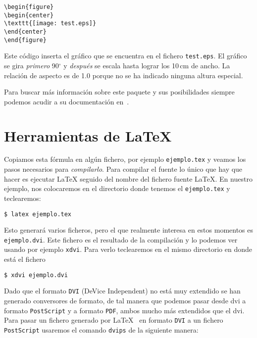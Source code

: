 \begin{code}
\begin{verbatim}
\begin{figure}
\begin{center}
\texttt{[image: test.eps]}
\end{center}
\end{figure}
\end{verbatim}
\end{code}

Este  código  inserta  el  gráfico  que se  encuentra  en  el  fichero
\texttt{test.eps}.  El gráfico  se  gira  \emph{primero} 90$^\circ$  y
\emph{después} se escala hasta lograr los 10\,cm de ancho. La relación
de aspecto es de 1.0 porque no se ha indicado ninguna altura especial.

Para buscar  más información  sobre este  paquete y  sus posibilidades
siempre podemos acudir a su documentación en~\cite{graphics}.

\section{Herramientas de \LaTeX}

Copiamos esta fórmula en algún  fichero, por ejemplo {\tt ejemplo.tex}
y veamos los pasos necesarios  para {\em compilarlo}. Para compilar el
fuente  lo  único que  hay  que  hacer  es ejecutar  {\LaTeX}  seguido
del  nombre  del fichero  fuente  {\LaTeX}.  En nuestro  ejemplo,  nos
colocaremos  en el  directorio donde  tenemos el  {\tt ejemplo.tex}  y
teclearemos:

\begin{verbatim}
$ latex ejemplo.tex
\end{verbatim}

Esto generará varios ficheros, pero el que realmente interesa en estos
momentos  es {\tt  ejemplo.dvi}. Este  fichero es  el resultado  de la
compilación y lo podemos ver usando por ejemplo {\tt xdvi}. Para verlo
teclearemos en el mismo directorio en donde está el fichero

\begin{verbatim}
$ xdvi ejemplo.dvi
\end{verbatim}

Dado  que  el formato  {\tt  DVI}  (DeVice  Independent) no  está  muy
extendido se  han generado conversores  de formato, de tal  manera que
podemos  pasar  desde dvi  a  formato  {\tt  PostScript} y  a  formato
{\tt  PDF}, ambos  mucho  más extendidos  que el  dvi.  Para pasar  un
fichero generado  por \LaTeX~ en formato  {\tt DVI} a un  fichero {\tt
PostScript} usaremos el comando {\tt dvips} de la siguiente manera:

